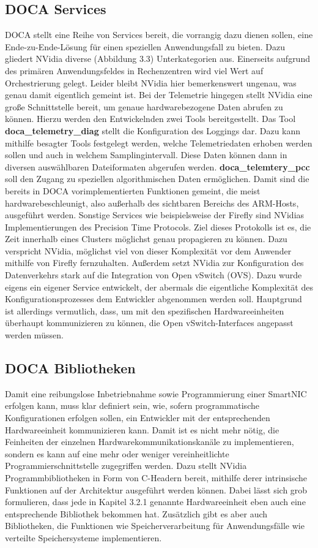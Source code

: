 \subsection{DOCA Services}
DOCA stellt eine Reihe von Services bereit, die vorrangig dazu dienen sollen, eine Ende-zu-Ende-Lösung für einen speziellen Anwendungsfall zu bieten. Dazu gliedert NVidia diverse (Abbildung 3.3) Unterkategorien aus. Einerseits aufgrund des primären Anwendungsfeldes in Rechenzentren wird viel Wert auf Orchestrierung gelegt. Leider bleibt NVidia hier bemerkenswert ungenau, was genau damit eigentlich gemeint ist. Bei der Telemetrie hingegen stellt NVidia eine große Schnittstelle bereit, um genaue hardwarebezogene Daten abrufen zu können. Hierzu werden den Entwickelnden zwei Tools bereitgestellt. Das Tool \textbf{doca\_telemetry\_diag} stellt die Konfiguration des Loggings dar. Dazu kann mithilfe besagter Tools festgelegt werden, welche Telemetriedaten erhoben werden sollen und auch in welchem Samplingintervall. Diese Daten können dann in diversen auswählbaren Dateiformaten abgerufen werden. \textbf{doca\_telemtery\_pcc} soll den Zugang zu speziellen algorithmischen Daten ermöglichen. Damit sind die bereits in DOCA vorimplementierten Funktionen gemeint, die meist hardwarebeschleunigt, also außerhalb des sichtbaren Bereichs des ARM-Hosts, ausgeführt werden. Sonstige Services wie beispielsweise der Firefly sind NVidias Implementierungen des Precision Time Protocols. Ziel dieses Protokolls ist es, die Zeit innerhalb eines Clusters möglichst genau propagieren zu können. Dazu verspricht NVidia, möglichst viel von dieser Komplexität vor dem Anwender mithilfe von Firefly fernzuhalten. Außerdem setzt NVidia zur Konfiguration des Datenverkehrs stark auf die Integration von Open vSwitch (OVS). Dazu wurde eigens ein eigener Service entwickelt, der abermals die eigentliche Komplexität des Konfigurationsprozesses dem Entwickler abgenommen werden soll. Hauptgrund ist allerdings vermutlich, dass, um mit den spezifischen Hardwareeinheiten überhaupt kommunizieren zu können, die Open vSwitch-Interfaces angepasst werden müssen. 
\subsection{DOCA Bibliotheken}
Damit eine reibungslose Inbetriebnahme sowie Programmierung einer SmartNIC erfolgen kann, muss klar definiert sein, wie, sofern programmatische Konfigurationen erfolgen sollen, ein Entwickler mit der entsprechenden Hardwareeinheit kommunizieren kann. Damit ist es nicht mehr nötig, die Feinheiten der einzelnen Hardwarekommunikationskanäle zu implementieren, sondern es kann auf eine mehr oder weniger vereinheitlichte Programmierschnittstelle zugegriffen werden. Dazu stellt NVidia Programmbibliotheken in Form von C-Headern bereit, mithilfe derer intrinsische Funktionen auf der Architektur ausgeführt werden können. Dabei lässt sich grob formulieren, dass jede in Kapitel 3.2.1 genannte Hardwareeinheit eben auch eine entsprechende Bibliothek bekommen hat. Zusätzlich gibt es aber auch Bibliotheken, die Funktionen wie Speicherverarbeitung für Anwendungsfälle wie verteilte Speichersysteme implementieren.
